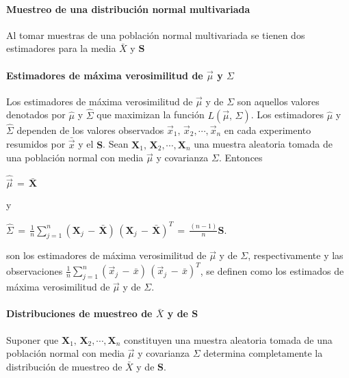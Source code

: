 \documentclass[spanish]{report}
\begin{document}
\paragraph{Muestreo de una distribución normal multivariada}
Al tomar muestras de una población normal multivariada se tienen dos estimadores para la media $\bar{X}$ y $\textbf{S}$ 
\paragraph{Estimadores de máxima verosimilitud de $\vec{\mu}$ y $\Sigma$}
Los estimadores de máxima verosimilitud de $\vec{\mu}$ y de $\Sigma$ son aquellos valores denotados por $\hat{\mu}$ y $\hat{\Sigma}$ que maximizan la función $L(\vec{\mu},\,\Sigma)$.
Los estimadores $\hat{\mu}$ y $\hat{\Sigma}$ dependen de los valores observados $\vec{x}_1,\,\vec{x}_2,\cdots,\vec{x}_n$ en cada experimento resumidos por $\bar{\vec{x}}$ y el $\textbf{S}$.
Sean $\textbf{X}_1,\,\textbf{X}_2,\cdots,\textbf{X}_n$ una muestra aleatoria tomada de una población normal con media $\vec{\mu}$ y covarianza $\Sigma$. Entonces
\vspace{10pt}

$\hat{\vec{\mu}}\,=\,\bar{\textbf{X}}\qquad$ 

\vspace{5pt}

y

\vspace{5pt}

$\hat{\Sigma}\,=\,\frac{1}{n}\sum_{j=1}^n (\textbf{X}_j\,-\,\bar{\textbf{X}})\,(\textbf{X}_j\,-\,\bar{\textbf{X}})^T\,=\,\frac{(n-1)}{n}\textbf{S}$.
\vspace{10pt}

son los estimadores de máxima verosimilitud de $\vec{\mu}$ y de $\Sigma$, respectivamente y las observaciones $\frac{1}{n}\sum_{j=1}^n (\vec{x}_j\,-\,\bar{x})\,(\vec{x}_j\,-\,\bar{x})^T$, se definen como los estimados de máxima verosimilitud de $\vec{\mu}$ y de $\Sigma$.

\paragraph{Distribuciones de muestreo de $\bar{X}$ y de $\textbf{S}$}

Suponer que  $\textbf{X}_1,\,\textbf{X}_2,\cdots,\textbf{X}_n$ constituyen una muestra aleatoria tomada de una población normal con media $\vec{\mu}$ y covarianza $\Sigma$ determina completamente la distribución de muestreo de $\bar{X}$ y de $\textbf{S}$.
\end{document}
